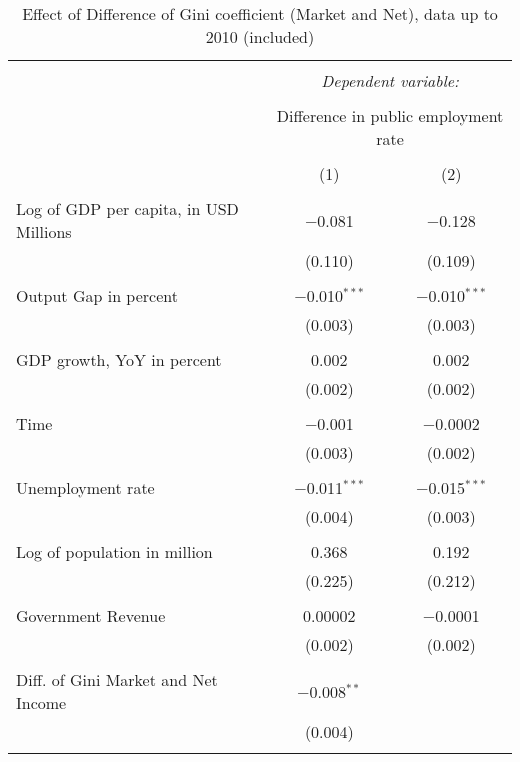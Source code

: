 
\begin{table}[!htbp] \centering 
  \caption{Effect of Difference of Gini coefficient (Market and Net), data up to 2010 (included)} 
  \label{} 
\begin{tabular}{@{\extracolsep{5pt}}lcc} 
\\[-1.8ex]\hline 
\hline \\[-1.8ex] 
 & \multicolumn{2}{c}{\textit{Dependent variable:}} \\ 
\cline{2-3} 
\\[-1.8ex] & \multicolumn{2}{c}{Difference in public employment rate} \\ 
\\[-1.8ex] & (1) & (2)\\ 
\hline \\[-1.8ex] 
 Log of GDP per capita, in USD Millions & $-$0.081 & $-$0.128 \\ 
  & (0.110) & (0.109) \\ 
  & & \\ 
 Output Gap in percent & $-$0.010$^{***}$ & $-$0.010$^{***}$ \\ 
  & (0.003) & (0.003) \\ 
  & & \\ 
 GDP growth, YoY in percent & 0.002 & 0.002 \\ 
  & (0.002) & (0.002) \\ 
  & & \\ 
 Time & $-$0.001 & $-$0.0002 \\ 
  & (0.003) & (0.002) \\ 
  & & \\ 
 Unemployment rate & $-$0.011$^{***}$ & $-$0.015$^{***}$ \\ 
  & (0.004) & (0.003) \\ 
  & & \\ 
 Log of population in million & 0.368 & 0.192 \\ 
  & (0.225) & (0.212) \\ 
  & & \\ 
 Government Revenue & 0.00002 & $-$0.0001 \\ 
  & (0.002) & (0.002) \\ 
  & & \\ 
 Diff. of Gini Market and Net Income & $-$0.008$^{**}$ &  \\ 
  & (0.004) &  \\ 
  & & \\ 

\end{tabular}
\end{table}
